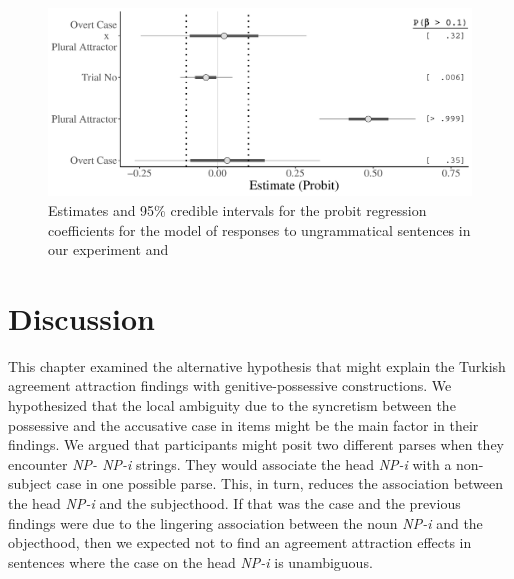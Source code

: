 \begin{knitrout}
\color{fgcolor}\begin{figure}[hbt!]

{\centering \includegraphics[width=\linewidth]{figure/exp1BayesUngram-1} 

}

\caption[Estimates and 95\% credible intervals for the probit regression coefficients for the model of responses to ungrammatical sentences in our experiment and Lago et al. (2019)]{Estimates and 95\% credible intervals for the probit regression coefficients for the model of responses to ungrammatical sentences in our experiment and \citet{LagoEtAl2019}}\label{fig:exp1BayesUngram}
\end{figure}
\end{knitrout}

\section{Discussion}

This chapter examined the alternative hypothesis that might explain the Turkish agreement attraction findings with genitive-possessive constructions. We hypothesized that the local ambiguity due to the syncretism between the possessive and the accusative case in \cites{LagoEtAl2019} items might be the main factor in their findings. We argued that participants might posit two different parses when they encounter \emph{NP-\Gen{} NP-i} strings. They would associate the head \emph{NP-i} with a non-subject case in one possible parse. This, in turn, reduces the association between the head \emph{NP-i} and the subjecthood. If that was the case and the previous findings were due to the lingering association between the noun \emph{NP-i} and the objecthood, then we expected not to find an agreement attraction effects in sentences where the case on the head \emph{NP-i} is unambiguous.

